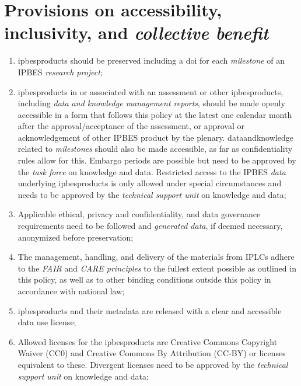 \documentclass{article}
\begin{document}
\section{Provisions on accessibility, inclusivity, and \textit{collective benefit}}

\begin{enumerate}[label=(\alph*)]
    \item \gls{ipbesproducts} should be preserved including a \gls{doi} for each \textit{milestone }of an IPBES \textit{research project};

    \item \gls{ipbesproducts} in or associated with an assessment or other \gls{ipbesproducts}, including \textit{data and knowledge management reports}, should be made openly accessible in a form that follows this policy at the latest one calendar month after the approval/acceptance of the assessment, or approval or acknowledgement of other IPBES product by the \gls{plenary}. \gls{dataandknowledge} related to \textit{milestones }should also be made accessible, as far as confidentiality rules allow for this. Embargo periods are possible but need to be approved by the \textit{task force }on knowledge and data. Restricted access to the IPBES \textit{data} underlying \gls{ipbesproducts} is only allowed under special circumstances and needs to be approved by the \textit{technical support unit }on knowledge and data;

    \item Applicable ethical, privacy and confidentiality, and data governance requirements need to be followed and \textit{generated data}, if deemed necessary, anonymized before preservation;

    \item The management, handling, and delivery of the materials from IPLCs adhere to the \textit{FAIR }and \textit{CARE principles} to the fullest extent possible as outlined in this policy, as well as to other binding conditions outside this policy in accordance with national law;

    \item \gls{ipbesproducts} and their metadata are released with a clear and accessible data use license;

    \item Allowed licenses for the \gls{ipbesproducts} are Creative Commons Copyright Waiver (CC0) and Creative Commons By Attribution (CC-BY) or licenses equivalent to these. Divergent licenses need to be approved by the \textit{technical support unit} on knowledge and data;


\end{enumerate}
\end{document}
